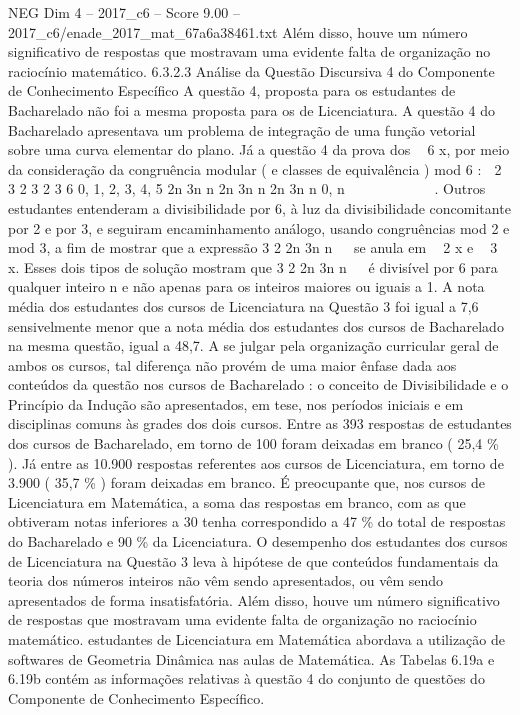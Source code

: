 \begin{textsample}{NEG Dim 4 – 2017\_c6 – Score 9.00 – 2017\_c6/enade\_2017\_mat\_67a6a38461.txt}
Além disso, houve um número significativo de respostas que mostravam uma evidente falta de organização no raciocínio matemático. 6.3.2.3 Análise da Questão Discursiva 4 do Componente de Conhecimento Específico A questão 4, proposta para os estudantes de Bacharelado não foi a mesma proposta para os de Licenciatura.
A questão 4 do Bacharelado apresentava um problema de integração de uma função vetorial sobre uma curva elementar do plano.
Já a questão 4 da prova dos  6 x, por meio da consideração da congruência modular ( e classes de equivalência ) mod 6 :  2 3 2 3 2 3 6 0, 1, 2, 3, 4, 5 2n 3n n 2n 3n n 2n 3n n 0, n          .
Outros estudantes entenderam a divisibilidade por 6, à luz da divisibilidade concomitante por 2 e por 3, e seguiram encaminhamento análogo, usando congruências mod 2 e mod 3, a fim de mostrar que a expressão 3 2 2n 3n n   se anula em  2 x e  3 x.
Esses dois tipos de solução mostram que 3 2 2n 3n n   é divisível por 6 para qualquer inteiro n e não apenas para os inteiros maiores ou iguais a 1.
A nota média dos estudantes dos cursos de Licenciatura na Questão 3 foi igual a 7,6 sensivelmente menor que a nota média dos estudantes dos cursos de Bacharelado na mesma questão, igual a 48,7.
A se julgar pela organização curricular geral de ambos os cursos, tal diferença não provém de uma maior ênfase dada aos conteúdos da questão nos cursos de Bacharelado : o conceito de Divisibilidade e o Princípio da Indução são apresentados, em tese, nos períodos iniciais e em disciplinas comuns às grades dos dois cursos.
Entre as 393 respostas de estudantes dos cursos de Bacharelado, em torno de 100 foram deixadas em branco ( 25,4 \% ).
Já entre as 10.900 respostas referentes aos cursos de Licenciatura, em torno de 3.900 ( 35,7 \% ) foram deixadas em branco.
É preocupante que, nos cursos de Licenciatura em Matemática, a soma das respostas em branco, com as que obtiveram notas inferiores a 30 tenha correspondido a 47 \% do total de respostas do Bacharelado e 90 \% da Licenciatura.
O desempenho dos estudantes dos cursos de Licenciatura na Questão 3 leva à hipótese de que conteúdos fundamentais da teoria dos números inteiros não vêm sendo apresentados, ou vêm sendo apresentados de forma insatisfatória.
Além disso, houve um número significativo de respostas que mostravam uma evidente falta de organização no raciocínio matemático. estudantes de Licenciatura em Matemática abordava a utilização de softwares de Geometria Dinâmica nas aulas de Matemática.
As Tabelas 6.19a e 6.19b contém as informações relativas à questão 4 do conjunto de questões do Componente de Conhecimento Específico.

\end{textsample}
